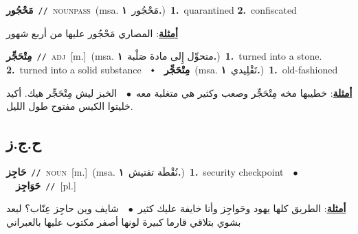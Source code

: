 \documentclass[10pt,a4paper,twoside]{article} %
\begin{document}
\begin{multicols}{2}
{{{{{{{{{{{\setlength\topsep{0pt}\textbf{\foreignlanguage{arabic}{مَحْجُور}}\ {\color{gray}\texttt{//}\color{black}}\ \textsc{noun\textunderscore pass}\ \color{gray}(msa. \foreignlanguage{arabic}{مَحْجُور}~\foreignlanguage{arabic}{\textbf{١.}})\color{black}\ \textbf{1.}~quarantined  \textbf{2.}~confiscated\  \begin{flushright}\color{gray}\foreignlanguage{arabic}{\textbf{\underline{\foreignlanguage{arabic}{أمثلة}}}: المصاري مَحْجُور عليها من أربع شهور}\end{flushright}\color{black}} \vspace{2mm}

{\setlength\topsep{0pt}\textbf{\foreignlanguage{arabic}{مِتْحَجِّر}}\ {\color{gray}\texttt{//}\color{black}}\ \textsc{adj}\ [m.]\ \color{gray}(msa. \foreignlanguage{arabic}{متحوِّل إِلى مادة صَلْبة}~\foreignlanguage{arabic}{\textbf{١.}})\color{black}\ \textbf{1.}~turned into a stone.  \textbf{2.}~turned into a solid substance\ \ $\smblkdiamond$\ \ \setlength\topsep{0pt}\textbf{\foreignlanguage{arabic}{مِتْحَجِّر}}\ \color{gray}(msa. \foreignlanguage{arabic}{تَقْلِيدي}~\foreignlanguage{arabic}{\textbf{١.}})\color{black}\ \textbf{1.}~old-fashioned\  \begin{flushright}\color{gray}\foreignlanguage{arabic}{\textbf{\underline{\foreignlanguage{arabic}{أمثلة}}}: خطيبها مخه مِتْحَجِّر وصعب وكثير هي متغلبة معه\ $\bullet$\ \  الخبز ليش مِتْحَجِّر هيك. أكيد خليتوا الكيس مفتوح طول الليل.}\end{flushright}\color{black}} \vspace{2mm}

\vspace{-3mm}
\subsection*{\color{blue}\foreignlanguage{arabic}{ح.ج.ز}\color{blue}{}} 

{\setlength\topsep{0pt}\textbf{\foreignlanguage{arabic}{حَاجِز}}\ {\color{gray}\texttt{//}\color{black}}\ \textsc{noun}\ [m.]\ \color{gray}(msa. \foreignlanguage{arabic}{نُقْطَة تفتيش}~\foreignlanguage{arabic}{\textbf{١.}})\color{black}\ \textbf{1.}~security checkpoint\ \ $\bullet$\ \ \setlength\topsep{0pt}\textbf{\foreignlanguage{arabic}{حَوَاجِز}}\ {\color{gray}\texttt{//}\color{black}}\ [pl.]\  \begin{flushright}\color{gray}\foreignlanguage{arabic}{\textbf{\underline{\foreignlanguage{arabic}{أمثلة}}}: الطريق كلها يهود وحَواجِز وأنا خايفة عليك كثير\ $\bullet$\ \  شايف وين حاجِز عِنّاب؟ لبعد بشوي بتلاقي قارما كبيرة لونها أصفر مكتوب عليها بالعبراني}\end{flushright}\color{black}} \vspace{2mm}

}}}}}}}}}}
\end{multicols}
\end{document}
